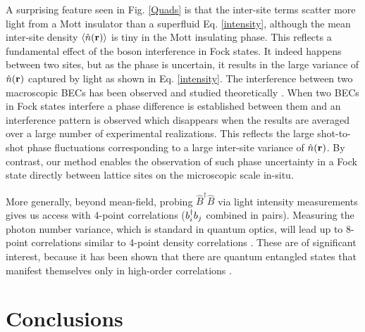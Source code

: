 A surprising feature seen in Fig. \ref{Quads} is that the inter-site
terms scatter more light from a Mott insulator than a superfluid
Eq. \eqref{intensity}, although the mean inter-site density
$\langle \hat{n}(\mathbf{r})\rangle $ is tiny in the Mott insulating
phase. This reflects a fundamental effect of the boson interference in
Fock states. It indeed happens between two sites, but as the phase is
uncertain, it results in the large variance of $\hat{n}(\mathbf{r})$
captured by light as shown in Eq. \eqref{intensity}. The interference
between two macroscopic BECs has been observed and studied
theoretically \cite{horak1999}. When two BECs in Fock states interfere
a phase difference is established between them and an interference
pattern is observed which disappears when the results are averaged
over a large number of experimental realizations. This reflects the
large shot-to-shot phase fluctuations corresponding to a large
inter-site variance of $\hat{n}(\mathbf{r})$. By contrast, our method
enables the observation of such phase uncertainty in a Fock state
directly between lattice sites on the microscopic scale in-situ.

More generally, beyond mean-field, probing $\hat{B}^\dagger \hat{B}$
via light intensity measurements gives us access with 4-point
correlations ($b^\dagger_i b_j$ combined in pairs). Measuring the photon
number variance, which is standard in quantum optics, will lead up to
8-point correlations similar to 4-point density correlations
\cite{mekhov2007pra}. These are of significant interest, because it
has been shown that there are quantum entangled states that manifest
themselves only in high-order correlations \cite{kaszlikowski2008}.

\section{Conclusions}


